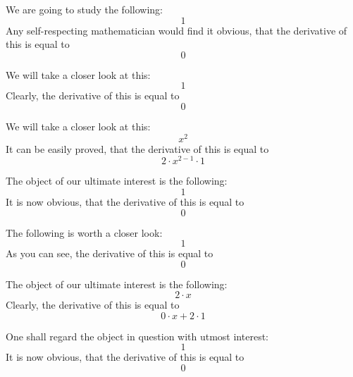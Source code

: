 \documentclass{article}
\begin{document}
We are going to study the following:
\begin{equation}
1 
\end{equation}
Any self-respecting mathematician would find it obvious, that the derivative of this is equal to
\begin{equation}
0 
\end{equation}

We will take a closer look at this:
\begin{equation}
1 
\end{equation}
Clearly, the derivative of this is equal to
\begin{equation}
0 
\end{equation}

We will take a closer look at this:
\begin{equation}
x ^{2 } 
\end{equation}
It can be easily proved, that the derivative of this is equal to
\begin{equation}
2 \cdot x ^{2 - 1 } \cdot 1 
\end{equation}

The object of our ultimate interest is the following:
\begin{equation}
1 
\end{equation}
It is now obvious, that the derivative of this is equal to
\begin{equation}
0 
\end{equation}

The following is worth a closer look:
\begin{equation}
1 
\end{equation}
As you can see, the derivative of this is equal to
\begin{equation}
0 
\end{equation}

The object of our ultimate interest is the following:
\begin{equation}
2 \cdot x 
\end{equation}
Clearly, the derivative of this is equal to
\begin{equation}
0 \cdot x + 2 \cdot 1 
\end{equation}

One shall regard the object in question with utmost interest:
\begin{equation}
1 
\end{equation}
It is now obvious, that the derivative of this is equal to
\begin{equation}
0 
\end{equation}
\end{document}
